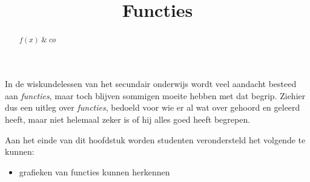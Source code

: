 \documentclass{ximera}
\title{Functies}
\begin{document}
\begin{abstract}
$f(x)  \;\&\; co$ 
\end{abstract}

\maketitle

  
In de wiskundelessen van het secundair onderwijs wordt veel aandacht besteed aan \textit{functies}, maar toch blijven sommigen moeite hebben met dat begrip. 
Ziehier dus een uitleg over \textit{functies}, bedoeld voor wie er al wat over gehoord en geleerd heeft, maar niet helemaal zeker is of hij alles goed heeft begrepen.

\begin{sectionOutcomes}

Aan het einde van dit hoofdstuk worden studenten verondersteld het volgende te kunnen:

\begin{itemize}
\item grafieken van functies kunnen herkennen
\end{itemize}

\end{sectionOutcomes}
\end{document}
